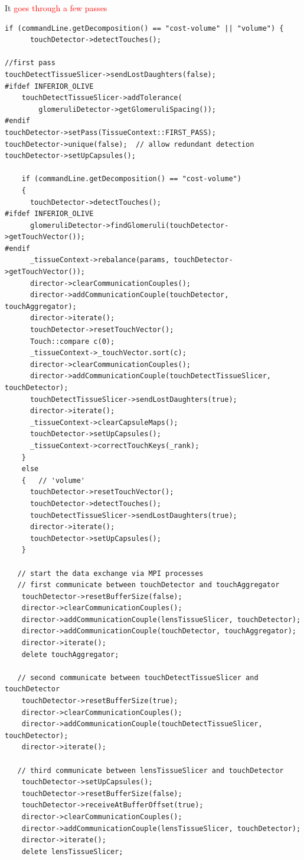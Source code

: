 It \textcolor{red}{goes through a few passes}

{\small
\begin{lstlisting}
if (commandLine.getDecomposition() == "cost-volume" || "volume") {
      touchDetector->detectTouches();

//first pass
touchDetectTissueSlicer->sendLostDaughters(false);
#ifdef INFERIOR_OLIVE
    touchDetectTissueSlicer->addTolerance(
        glomeruliDetector->getGlomeruliSpacing());
#endif
touchDetector->setPass(TissueContext::FIRST_PASS);
touchDetector->unique(false);  // allow redundant detection
touchDetector->setUpCapsules();

    if (commandLine.getDecomposition() == "cost-volume")
    {
      touchDetector->detectTouches();
#ifdef INFERIOR_OLIVE
      glomeruliDetector->findGlomeruli(touchDetector->getTouchVector());
#endif
      _tissueContext->rebalance(params, touchDetector->getTouchVector());
      director->clearCommunicationCouples();
      director->addCommunicationCouple(touchDetector, touchAggregator);
      director->iterate();
      touchDetector->resetTouchVector();
      Touch::compare c(0);
      _tissueContext->_touchVector.sort(c);
      director->clearCommunicationCouples();
      director->addCommunicationCouple(touchDetectTissueSlicer, touchDetector);
      touchDetectTissueSlicer->sendLostDaughters(true);
      director->iterate();
      _tissueContext->clearCapsuleMaps();
      touchDetector->setUpCapsules();
      _tissueContext->correctTouchKeys(_rank);
    }
    else
	{   // 'volume'
      touchDetector->resetTouchVector();
      touchDetector->detectTouches();
      touchDetectTissueSlicer->sendLostDaughters(true);
      director->iterate();
      touchDetector->setUpCapsules();
	}

   // start the data exchange via MPI processes
   // first communicate between touchDetector and touchAggregator
    touchDetector->resetBufferSize(false);
    director->clearCommunicationCouples();
    director->addCommunicationCouple(lensTissueSlicer, touchDetector);
    director->addCommunicationCouple(touchDetector, touchAggregator);
    director->iterate();
    delete touchAggregator;

   // second communicate between touchDetectTissueSlicer and touchDetector
    touchDetector->resetBufferSize(true);
    director->clearCommunicationCouples();
    director->addCommunicationCouple(touchDetectTissueSlicer, touchDetector);
    director->iterate();
   
   // third communicate between lensTissueSlicer and touchDetector
    touchDetector->setUpCapsules();
    touchDetector->resetBufferSize(false);
    touchDetector->receiveAtBufferOffset(true);
    director->clearCommunicationCouples();
    director->addCommunicationCouple(lensTissueSlicer, touchDetector);
    director->iterate();
    delete lensTissueSlicer;


\end{lstlisting}}
